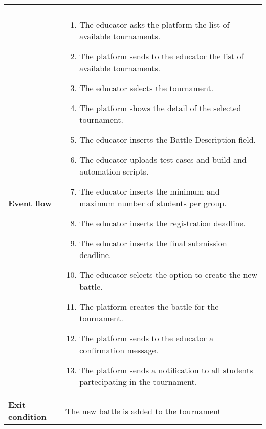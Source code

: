 \begin{enumerate}[label=\textbf{UC\arabic*}:,ref=UC\arabic*,leftmargin=1.3cm]
{\begin{table}[H]
\begin{tabular}{|l|p{11.9cm}|}
\begin{itemize}
                        \end{itemize}                                                                                                                                  \\\hline
                        \textbf{Event flow}      &
                        \begin{enumerate}[label=\arabic*.]
                              \item The educator asks the platform the list of available tournaments.
                              \item The platform sends to the educator the list of available tournaments.
                              \item The educator selects the tournament.
                              \item The platform shows the detail of the selected tournament.
                              \item The educator inserts the Battle Description field.
                              \item The educator uploads test cases and build and automation scripts.
                              \item The educator inserts the minimum and maximum number of students per group.
                              \item The educator inserts the registration deadline.
                              \item The educator inserts the final submission deadline.
                              \item The educator selects the option to create the new battle.
                              \item The platform creates the battle for the tournament.
                              \item The platform sends to the educator a confirmation message.
                              \item The platform sends a notification to all students partecipating in the tournament.
                        \end{enumerate}                                                                                                \\\hline
                        \textbf{Exit condition}  & The new battle is added to the tournament                                                                                                                   \\\hline

\end{tabular}
\end{table}}
\end{enumerate}
